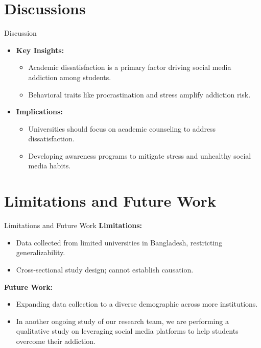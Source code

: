 \documentclass{beamer}
\begin{document}
\section{Discussions}
\begin{frame}{Discussion}
    \begin{itemize}
        \item \textbf{Key Insights:}
        \begin{itemize}
            \item Academic dissatisfaction is a primary factor driving social media addiction among students.
            \item Behavioral traits like procrastination and stress amplify addiction risk.
        \end{itemize}
        
        \item \textbf{Implications:}
        \begin{itemize}
            \item Universities should focus on academic counseling to address dissatisfaction.
            \item Developing awareness programs to mitigate stress and unhealthy social media habits.
        \end{itemize}
    \end{itemize}
\end{frame}

\section{Limitations and Future Work}
\begin{frame}{Limitations and Future Work}
    \textbf{Limitations:}
    \begin{itemize}
        \item Data collected from limited universities in Bangladesh, restricting generalizability.
        \item Cross-sectional study design; cannot establish causation.
    \end{itemize}

    \textbf{Future Work:}
    \begin{itemize}
        \item Expanding data collection to a diverse demographic across more institutions.
        \item In another ongoing study of our research team, we are performing a qualitative study on leveraging social media platforms to help students overcome their addiction.
    \end{itemize}
    
\end{frame}
\end{document}
